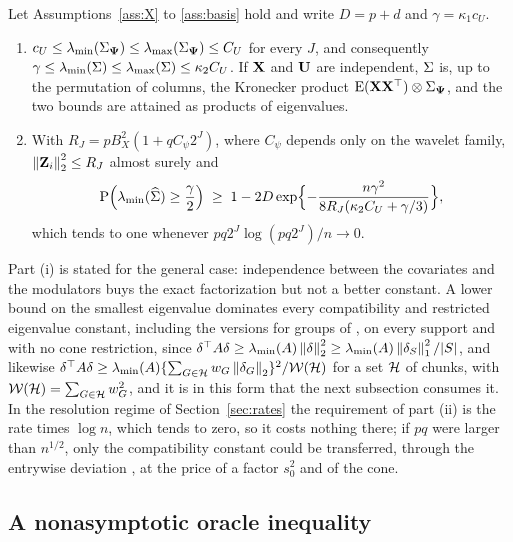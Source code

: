 \begin{proposition}
\label{prop:gram}
Let Assumptions~\ref{ass:X} to \ref{ass:basis} hold and write $D = p + d$ and
$\gamma = \kappa_1 c_U$.
\begin{enumerate}
\item[(i)] $c_U \le \lambda_{\min}(\Sigma_{\boldsymbol{\Psi}}) \le \lambda_{\max}(\Sigma_{\boldsymbol{\Psi}}) \le C_U$
for every $J$, and consequently
$\gamma \le \lambda_{\min}(\Sigma) \le \lambda_{\max}(\Sigma) \le \kappa_2 C_U$. If $\mathbf{X}$ and
$\mathbf{U}$ are independent, $\Sigma$ is, up to the permutation of columns, the
Kronecker product $\mathrm{E}(\mathbf{X}\mathbf{X}^{\top})\otimes\Sigma_{\boldsymbol{\Psi}}$, and the two bounds are
attained as products of eigenvalues.
\item[(ii)] With $R_J = pB_X^{2}(1 + qC_\psi 2^{J})$, where $C_\psi$ depends
only on the wavelet family, $\left\lVert \mathbf{Z}_i \right\rVert_2^{2} \le R_J$ almost surely and
\[
  \mathrm{P}\Bigl(\lambda_{\min}(\widehat{\Sigma}) \ge \frac{\gamma}{2}\Bigr)
  \;\ge\; 1 - 2D\exp\Bigl\{-\frac{n\gamma^{2}}
  {8R_J(\kappa_2C_U + \gamma/3)}\Bigr\},
\]
which tends to one whenever $pq2^{J}\log(pq2^{J})/n \to 0$.
\end{enumerate}
\end{proposition}

Part (i) is stated for the general case: independence between the covariates
and the modulators buys the exact factorization but not a better constant. A
lower bound on the smallest eigenvalue dominates every compatibility and
restricted eigenvalue constant, including the versions for groups
of \citet{Lounici-Pontil-vandeGeer-Tsybakov-2011}, on every support and with no cone restriction,
since $\delta^{\top} A \delta \ge \lambda_{\min}(A)\left\lVert \delta \right\rVert_2^2 \ge
\lambda_{\min}(A)\left\lVert \delta_S \right\rVert_1^2/|S|$, and likewise
$\delta^{\top} A\delta \ge \lambda_{\min}(A)\{\sum_{G\in\mathcal{H}}w_{G}\left\lVert \delta_{G} \right\rVert_{2}\}^{2}/\mathcal{W}(\mathcal{H})$
for a set $\mathcal{H}$ of chunks, with $\mathcal{W}(\mathcal{H}) = \sum_{G\in\mathcal{H}}w_{G}^{2}$,
and it is in this form that the next
subsection consumes it. In the resolution regime of Section~\ref{sec:rates}
the requirement of part (ii) is the
rate times $\log n$, which tends to zero, so it
costs nothing there; if $pq$ were larger than $n^{1/2}$, only the
compatibility constant could be transferred, through the entrywise deviation
\citep[Corollary 6.8]{buhlmann2011statistics}, at the price of a factor
$s_0^{2}$ and of the cone.

\subsection{A nonasymptotic oracle inequality}
\label{sec:oracle}

